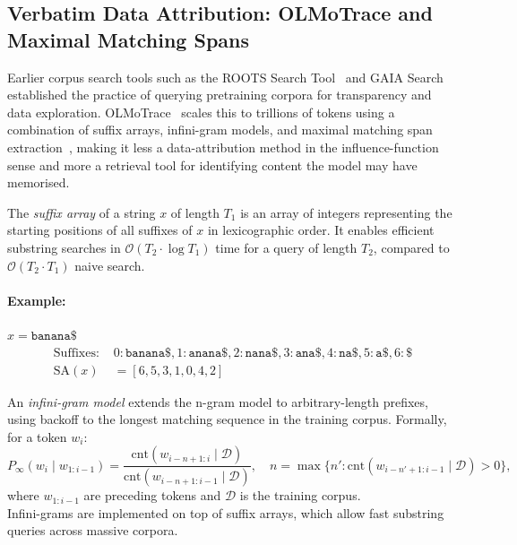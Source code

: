 \subsection{Verbatim Data Attribution: OLMoTrace and Maximal Matching Spans}



Earlier corpus search tools such as the ROOTS Search Tool~ and GAIA Search~ established the practice of querying pretraining corpora for transparency and data exploration. OLMoTrace~ scales this to trillions of tokens using a combination of suffix arrays, infini-gram models, and maximal matching span extraction~, making it less a data-attribution method in the influence-function sense and more a retrieval tool for identifying content the model may have memorised.

\begin{definitionbox}
\label{def:suffix-array}
The \emph{suffix array} of a string $x$ of length $T_1$ is an array of integers representing the starting positions of all suffixes of $x$ in lexicographic order. It enables efficient substring searches in $\mathcal{O}(T_2 \cdot \log T_1)$ time for a query of length $T_2$, compared to $\mathcal{O}(T_2 \cdot T_1)$ naive search.\\

\paragraph{Example:} $x = \texttt{banana\$}$
\begin{align*}
\text{Suffixes: } & 0:\texttt{banana\$}, 1:\texttt{anana\$}, 2:\texttt{nana\$}, 3:\texttt{ana\$}, 4:\texttt{na\$}, 5:\texttt{a\$}, 6:\texttt{\$} \\
\text{SA}(x) &= [6, 5, 3, 1, 0, 4, 2]
\end{align*}
\end{definitionbox}

\begin{definitionbox}
\label{def:infini-gram}
An \emph{infini-gram model} extends the n-gram model to arbitrary-length prefixes, using backoff to the longest matching sequence in the training corpus. Formally, for a token $w_i$:
\[
P_{\infty}(w_i \mid w_{1:i-1}) = \frac{\text{cnt}(w_{i-n+1:i} \mid \mathcal{D})}{\text{cnt}(w_{i-n+1:i-1} \mid \mathcal{D})}, 
\quad n = \max \{ n' : \text{cnt}(w_{i-n'+1:i-1} \mid \mathcal{D})>0\},
\]
where $w_{1:i-1}$ are preceding tokens and $\mathcal{D}$ is the training corpus.\\

Infini-grams are implemented on top of suffix arrays, which allow fast substring queries across massive corpora.
\end{definitionbox}

